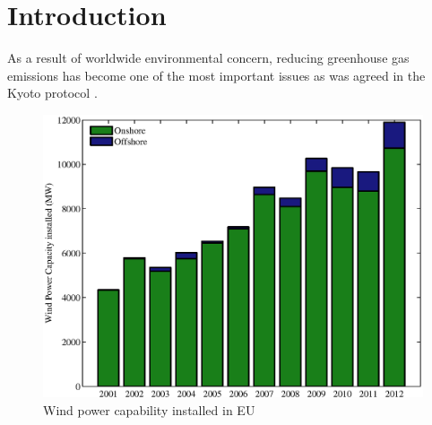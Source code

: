\chapter{Introduction}
As a result of worldwide environmental concern, reducing greenhouse gas emissions has become one of the most important issues as was agreed in the Kyoto protocol \cite{Kyoto}.

\begin{figure}[h!]
\centering
\includegraphics[width=0.75\columnwidth]{./Introduction/Inst.eps}
\caption{Wind power capability installed in EU \cite{EWEA2013}}
\label{fig:Inst}
\end{figure}

